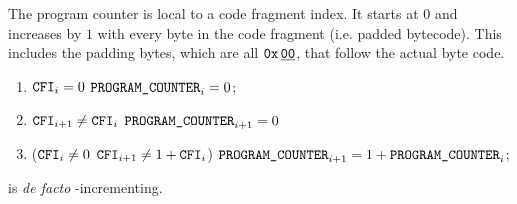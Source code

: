 The program counter \romColumnProgramCounter{} is local to a code fragment index.
It starts at $0$ and increases by $1$ with every byte in the code fragment (i.e. padded bytecode).
This includes the padding bytes, which are all $\texttt{0x\,}\underline{\texttt{00}}$, that follow the actual byte code.
\begin{enumerate}
    \item \If $\texttt{CFI} _{i} = 0$ \Then $\texttt{PROGRAM\_COUNTER} _{i} = 0$;
    \item \If $\texttt{CFI} _{i + 1} \neq \texttt{CFI} _{i}$ \Then $\texttt{PROGRAM\_COUNTER} _{i + 1} = 0$
    \item \If \Big($\texttt{CFI} _{i} \neq 0$ \et $\texttt{CFI} _{i + 1} \neq 1 + \texttt{CFI} _{i}$\Big) \Then $\texttt{PROGRAM\_COUNTER} _{i + 1} = 1 + \texttt{PROGRAM\_COUNTER} _{i}$;
\end{enumerate}
\saNote{}
\romColumnProgramCounter{} is \emph{de facto} \cfi-incrementing.
